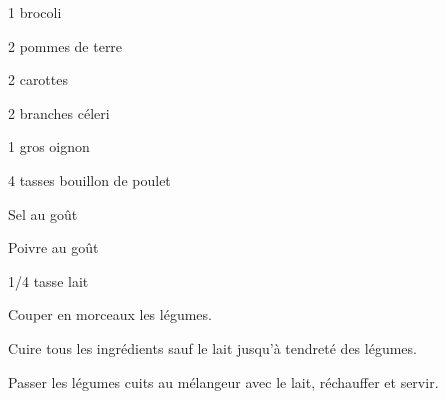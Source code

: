 


\totaltime{}


\begin{ingredients}
    \item 1 brocoli
    \item 2 pommes de terre
    \item 2 carottes
    \item 2 branches céleri
    \item 1 gros oignon
    \item 4 tasses bouillon de poulet
    \item Sel au goût
    \item Poivre au goût
    \item 1/4 tasse lait
\end{ingredients}

\begin{steps}
    \item Couper en morceaux les légumes.
    \item Cuire tous les ingrédients sauf le lait jusqu'à tendreté des légumes.
    \item Passer les légumes cuits au mélangeur avec le lait, réchauffer et servir.
\end{steps}

